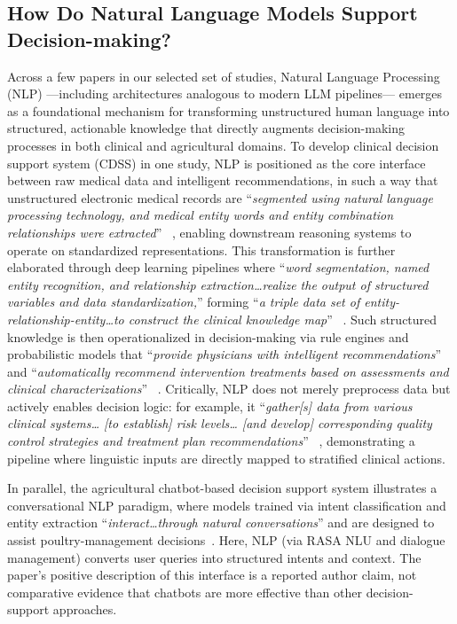 \documentclass{sfuthesis}
\begin{document}
\subsection{How Do Natural Language Models Support Decision-making?}
Across a few papers in our selected set of studies, Natural Language Processing (NLP) —including architectures analogous to modern LLM pipelines— emerges as a foundational mechanism for transforming unstructured human language into structured, actionable knowledge that directly augments decision-making processes in both clinical and agricultural domains. To develop clinical decision support system (CDSS) in one study, NLP is positioned as the core interface between raw medical data and intelligent recommendations, in such a way that unstructured electronic medical records are “\textit{segmented using natural language processing technology, and medical entity words and entity combination relationships were extracted}” ~\cite{miao2025construction}, enabling downstream reasoning systems to operate on standardized representations. This transformation is further elaborated through deep learning pipelines where “\textit{word segmentation, named entity recognition, and relationship extraction…realize the output of structured variables and data standardization,}” forming “\textit{a triple data set of entity-relationship-entity…to construct the clinical knowledge map}” ~\cite{miao2025construction}. Such structured knowledge is then operationalized in decision-making via rule engines and probabilistic models that “\textit{provide physicians with intelligent recommendations}” and “\textit{automatically recommend intervention treatments based on assessments and clinical characterizations}” ~\cite{miao2025construction}. Critically, NLP does not merely preprocess data but actively enables decision logic: for example, it “\textit{gather[s] data from various clinical systems… [to establish] risk levels… [and develop] corresponding quality control strategies and treatment plan recommendations}” ~\cite{miao2025construction}, demonstrating a pipeline where linguistic inputs are directly mapped to stratified clinical actions.\par
In parallel, the agricultural chatbot-based decision support system illustrates a conversational NLP paradigm, where models trained via intent classification and entity extraction “\textit{interact…through natural conversations}” and are designed to assist poultry-management decisions~\cite{Shapa2021PoultryFarmers}. Here, NLP (via RASA NLU and dialogue management) converts user queries into structured intents and context. The paper's positive description of this interface is a reported author claim, not comparative evidence that chatbots are more effective than other decision-support approaches.\par
\end{document}

